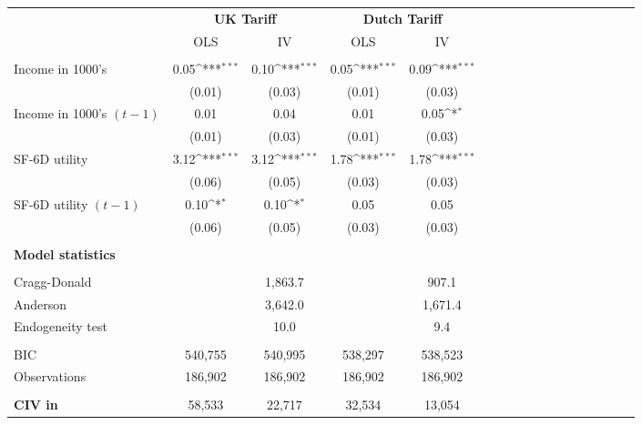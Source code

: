 {
\def\sym#1{\ifmmode^{#1}\else\(^{#1}\)\fi}
\begin{tabular}{l*{4}{cccc}}
\hline\hline
                    &\multicolumn{2}{c}{\textbf{UK Tariff}}     &\multicolumn{2}{c}{\textbf{Dutch Tariff}}  \\\cmidrule(lr){2-3}\cmidrule(lr){4-5}
                    &\multicolumn{1}{c}{OLS}&\multicolumn{1}{c}{IV}&\multicolumn{1}{c}{OLS}&\multicolumn{1}{c}{IV}\\
\hline
\\ Income in 1000's &        0.05\sym{***}&        0.10\sym{***}&        0.05\sym{***}&        0.09\sym{***}\\
                    &      (0.01)         &      (0.03)         &      (0.01)         &      (0.03)         \\
[1em]
Income in 1000's $(t-1)$&        0.01         &        0.04         &        0.01         &        0.05\sym{*}  \\
                    &      (0.01)         &      (0.03)         &      (0.01)         &      (0.03)         \\
[1em]
SF-6D utility       &        3.12\sym{***}&        3.12\sym{***}&        1.78\sym{***}&        1.78\sym{***}\\
                    &      (0.06)         &      (0.05)         &      (0.03)         &      (0.03)         \\
[1em]
SF-6D utility $(t-1)$&        0.10\sym{*}  &        0.10\sym{*}  &        0.05         &        0.05         \\
                    &      (0.06)         &      (0.05)         &      (0.03)         &      (0.03)         \\
\hline
\\ \textbf{Model statistics}&                     &                     &                     &                     \\
\hline \\ Cragg-Donald&                     &     1,863.7         &                     &       907.1         \\
Anderson            &                     &     3,642.0         &                     &     1,671.4         \\
Endogeneity test    &                     &        10.0         &                     &         9.4         \\
\\ BIC              &     540,755         &     540,995         &     538,297         &     538,523         \\
Observations        &     186,902         &     186,902         &     186,902         &     186,902         \\
\hline \\ \textbf{CIV in \EUR{}}&      58,533         &      22,717         &      32,534         &      13,054         \\
\hline\hline
\end{tabular}
}
